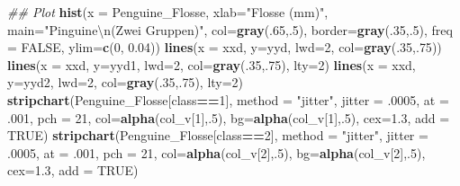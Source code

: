 \documentclass[
  ngerman,
]{book}
\newenvironment{Shaded}{\begin{snugshade}}{\end{snugshade}}
\newcommand{\CharTok}[1]{\textcolor[rgb]{0.31,0.60,0.02}{#1}}
\newcommand{\CommentTok}[1]{\textcolor[rgb]{0.56,0.35,0.01}{\textit{#1}}}
\newcommand{\DataTypeTok}[1]{\textcolor[rgb]{0.13,0.29,0.53}{#1}}
\newcommand{\DecValTok}[1]{\textcolor[rgb]{0.00,0.00,0.81}{#1}}
\newcommand{\FloatTok}[1]{\textcolor[rgb]{0.00,0.00,0.81}{#1}}
\newcommand{\KeywordTok}[1]{\textcolor[rgb]{0.13,0.29,0.53}{\textbf{#1}}}
\newcommand{\NormalTok}[1]{#1}
\newcommand{\OperatorTok}[1]{\textcolor[rgb]{0.81,0.36,0.00}{\textbf{#1}}}
\newcommand{\OtherTok}[1]{\textcolor[rgb]{0.56,0.35,0.01}{#1}}
\newcommand{\StringTok}[1]{\textcolor[rgb]{0.31,0.60,0.02}{#1}}
\begin{document}
\begin{Shaded}
\begin{Highlighting}[]
\CommentTok{## Plot}
\KeywordTok{hist}\NormalTok{(}\DataTypeTok{x =}\NormalTok{ Penguine_Flosse, }\DataTypeTok{xlab=}\StringTok{"Flosse (mm)"}\NormalTok{, }\DataTypeTok{main=}\StringTok{"Pinguine}\CharTok{\textbackslash{}n}\StringTok{(Zwei Gruppen)"}\NormalTok{,}
     \DataTypeTok{col=}\KeywordTok{gray}\NormalTok{(.}\DecValTok{65}\NormalTok{,.}\DecValTok{5}\NormalTok{), }\DataTypeTok{border=}\KeywordTok{gray}\NormalTok{(.}\DecValTok{35}\NormalTok{,.}\DecValTok{5}\NormalTok{), }\DataTypeTok{freq =} \OtherTok{FALSE}\NormalTok{, }\DataTypeTok{ylim=}\KeywordTok{c}\NormalTok{(}\DecValTok{0}\NormalTok{, }\FloatTok{0.04}\NormalTok{))}
\KeywordTok{lines}\NormalTok{(}\DataTypeTok{x =}\NormalTok{ xxd, }\DataTypeTok{y=}\NormalTok{yyd, }\DataTypeTok{lwd=}\DecValTok{2}\NormalTok{, }\DataTypeTok{col=}\KeywordTok{gray}\NormalTok{(.}\DecValTok{35}\NormalTok{,.}\DecValTok{75}\NormalTok{))}
\KeywordTok{lines}\NormalTok{(}\DataTypeTok{x =}\NormalTok{ xxd, }\DataTypeTok{y=}\NormalTok{yyd1, }\DataTypeTok{lwd=}\DecValTok{2}\NormalTok{, }\DataTypeTok{col=}\KeywordTok{gray}\NormalTok{(.}\DecValTok{35}\NormalTok{,.}\DecValTok{75}\NormalTok{), }\DataTypeTok{lty=}\DecValTok{2}\NormalTok{)}
\KeywordTok{lines}\NormalTok{(}\DataTypeTok{x =}\NormalTok{ xxd, }\DataTypeTok{y=}\NormalTok{yyd2, }\DataTypeTok{lwd=}\DecValTok{2}\NormalTok{, }\DataTypeTok{col=}\KeywordTok{gray}\NormalTok{(.}\DecValTok{35}\NormalTok{,.}\DecValTok{75}\NormalTok{), }\DataTypeTok{lty=}\DecValTok{2}\NormalTok{)}
\KeywordTok{stripchart}\NormalTok{(Penguine_Flosse[class}\OperatorTok{==}\DecValTok{1}\NormalTok{], }\DataTypeTok{method =} \StringTok{"jitter"}\NormalTok{, }\DataTypeTok{jitter =} \FloatTok{.0005}\NormalTok{, }\DataTypeTok{at =} \FloatTok{.001}\NormalTok{,}
           \DataTypeTok{pch =} \DecValTok{21}\NormalTok{, }\DataTypeTok{col=}\KeywordTok{alpha}\NormalTok{(col_v[}\DecValTok{1}\NormalTok{],.}\DecValTok{5}\NormalTok{), }\DataTypeTok{bg=}\KeywordTok{alpha}\NormalTok{(col_v[}\DecValTok{1}\NormalTok{],.}\DecValTok{5}\NormalTok{), }\DataTypeTok{cex=}\FloatTok{1.3}\NormalTok{, }\DataTypeTok{add =} \OtherTok{TRUE}\NormalTok{)}
\KeywordTok{stripchart}\NormalTok{(Penguine_Flosse[class}\OperatorTok{==}\DecValTok{2}\NormalTok{], }\DataTypeTok{method =} \StringTok{"jitter"}\NormalTok{, }\DataTypeTok{jitter =} \FloatTok{.0005}\NormalTok{, }\DataTypeTok{at =} \FloatTok{.001}\NormalTok{,}
           \DataTypeTok{pch =} \DecValTok{21}\NormalTok{, }\DataTypeTok{col=}\KeywordTok{alpha}\NormalTok{(col_v[}\DecValTok{2}\NormalTok{],.}\DecValTok{5}\NormalTok{), }\DataTypeTok{bg=}\KeywordTok{alpha}\NormalTok{(col_v[}\DecValTok{2}\NormalTok{],.}\DecValTok{5}\NormalTok{), }\DataTypeTok{cex=}\FloatTok{1.3}\NormalTok{, }\DataTypeTok{add =} \OtherTok{TRUE}\NormalTok{)}
\end{Highlighting}
\end{Shaded}
\end{document}
